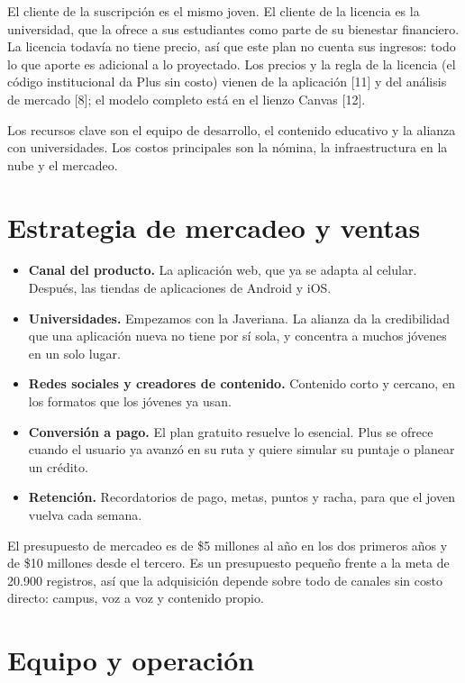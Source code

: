 \documentclass[11pt,a4paper]{article}
\begin{document}
El cliente de la suscripción es el mismo joven. El cliente de la licencia es la universidad, que la ofrece a sus estudiantes como parte de su bienestar financiero. La licencia todavía no tiene precio, así que este plan no cuenta sus ingresos: todo lo que aporte es adicional a lo proyectado. Los precios y la regla de la licencia (el código institucional da Plus sin costo) vienen de la aplicación [11] y del análisis de mercado [8]; el modelo completo está en el lienzo Canvas [12].

Los recursos clave son el equipo de desarrollo, el contenido educativo y la alianza con universidades. Los costos principales son la nómina, la infraestructura en la nube y el mercadeo.

\section{Estrategia de mercadeo y ventas}

\begin{itemize}[leftmargin=1.5em]
  \item \textbf{Canal del producto.} La aplicación web, que ya se adapta al celular. Después, las tiendas de aplicaciones de Android y iOS.
  \item \textbf{Universidades.} Empezamos con la Javeriana. La alianza da la credibilidad que una aplicación nueva no tiene por sí sola, y concentra a muchos jóvenes en un solo lugar.
  \item \textbf{Redes sociales y creadores de contenido.} Contenido corto y cercano, en los formatos que los jóvenes ya usan.
  \item \textbf{Conversión a pago.} El plan gratuito resuelve lo esencial. Plus se ofrece cuando el usuario ya avanzó en su ruta y quiere simular su puntaje o planear un crédito.
  \item \textbf{Retención.} Recordatorios de pago, metas, puntos y racha, para que el joven vuelva cada semana.
\end{itemize}

El presupuesto de mercadeo es de \$5 millones al año en los dos primeros años y de \$10 millones desde el tercero. Es un presupuesto pequeño frente a la meta de 20.900 registros, así que la adquisición depende sobre todo de canales sin costo directo: campus, voz a voz y contenido propio.

\section{Equipo y operación}
\end{document}
